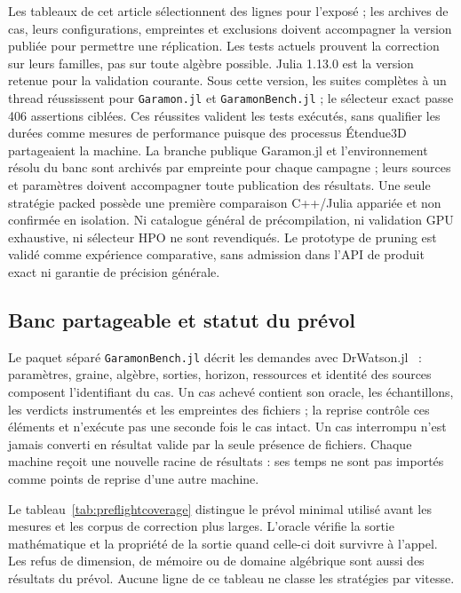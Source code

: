 \documentclass[11pt,a4paper]{article}
\newcommand{\code}[1]{\texttt{#1}}
\begin{document}
Les tableaux de cet article sélectionnent des lignes pour l'exposé ; les
archives de cas, leurs configurations, empreintes et exclusions doivent
accompagner la version publiée pour permettre une réplication. Les tests actuels
prouvent la correction sur leurs familles, pas sur toute algèbre possible.
Julia 1.13.0 est la version retenue pour la validation courante.
Sous cette version, les suites complètes à un thread réussissent pour
\code{Garamon.jl} et \code{GaramonBench.jl} ; le sélecteur exact passe
406 assertions ciblées.
Ces réussites
valident les tests exécutés, sans qualifier les durées comme mesures
de performance puisque des processus Étendue3D partageaient la machine.
La branche publique Garamon.jl et l'environnement résolu du banc sont
archivés par empreinte pour chaque campagne ; leurs sources et paramètres
doivent accompagner toute publication des résultats. Une seule stratégie
packed possède une première
comparaison C++/Julia appariée et non confirmée en isolation. Ni catalogue
général de précompilation, ni validation GPU exhaustive, ni sélecteur HPO ne
sont revendiqués. Le
prototype de pruning est validé comme expérience comparative, sans admission
dans l'API de produit exact ni garantie de précision générale.

\subsection{Banc partageable et statut du prévol}
\label{sec:transfer}
Le paquet séparé \code{GaramonBench.jl} décrit les demandes avec
DrWatson.jl~\cite{drwatson} : paramètres, graine, algèbre, sorties,
horizon, ressources et identité des sources composent l'identifiant du
cas. Un cas achevé contient son oracle, les échantillons, les verdicts
instrumentés et les empreintes des fichiers ; la reprise contrôle ces
éléments et n'exécute pas une seconde fois le cas intact. Un cas
interrompu n'est jamais converti en résultat valide par la seule
présence de fichiers. Chaque machine reçoit une nouvelle racine de
résultats : ses temps ne sont pas importés comme points de reprise
d'une autre machine.

Le tableau~\ref{tab:preflightcoverage} distingue le prévol minimal
utilisé avant les mesures et les corpus de correction plus larges.
L'oracle vérifie la sortie mathématique et la propriété de la sortie
quand celle-ci doit survivre à l'appel. Les refus de dimension, de
mémoire ou de domaine algébrique sont aussi des résultats du prévol.
Aucune ligne de ce tableau ne classe les stratégies par vitesse.
\end{document}

